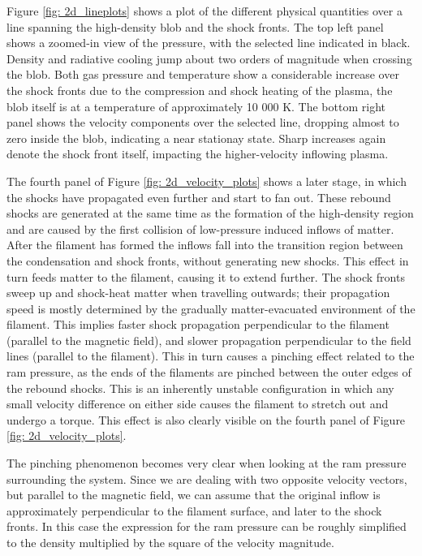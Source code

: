 Figure \ref{fig: 2d_lineplots} shows a plot of the different physical quantities over a line spanning the high-density blob and the shock fronts. The top left panel shows a zoomed-in view of the pressure, with the selected line indicated in black. Density and radiative cooling jump about two orders of magnitude when crossing the blob. Both gas pressure and temperature show a considerable increase over the shock fronts due to the compression and shock heating of the plasma, the blob itself is at a temperature of approximately 10 000 K. The bottom right panel shows the velocity components over the selected line, dropping almost to zero inside the blob, indicating a near stationay state. Sharp increases again denote the shock front itself, impacting the higher-velocity inflowing plasma.

The fourth panel of Figure \ref{fig: 2d_velocity_plots} shows a later stage, in which the shocks have propagated even further and start to fan out. These rebound shocks are generated at the same time as the formation of the high-density region and are caused by the first collision of low-pressure induced inflows of matter. After the filament has formed the inflows fall into the transition region between the condensation and shock fronts, without generating new shocks. This effect in turn feeds matter to the filament, causing it to extend further. The shock fronts sweep up and shock-heat matter when travelling outwards; their propagation speed is mostly determined by the gradually matter-evacuated environment of the filament. This implies faster shock propagation perpendicular to the filament (parallel to the magnetic field), and slower propagation perpendicular to the field lines (parallel to the filament). This in turn causes a pinching effect related to the ram pressure, as the ends of the filaments are pinched between the outer edges of the rebound shocks. This is an inherently unstable configuration in which any small velocity difference on either side causes the filament to stretch out and undergo a torque. This effect is also clearly visible on the fourth panel of Figure \ref{fig: 2d_velocity_plots}.

The pinching phenomenon becomes very clear when looking at the ram pressure surrounding the system. Since we are dealing with two opposite velocity vectors, but parallel to the magnetic field, we can assume that the original inflow is approximately perpendicular to the filament surface, and later to the shock fronts. In this case the expression for the ram pressure can be roughly simplified to the density multiplied by the square of the velocity magnitude.

